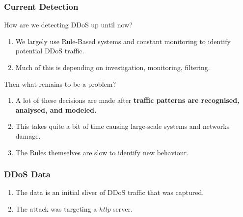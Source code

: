 \documentclass[11pt,
               aspectratio=169,
               hyperref={colorlinks}
               ]{beamer}
\begin{document}
	\begin{frame}
            \frametitle{Current Detection}
		How are we detecting DDoS up until now?\\
		\begin{enumerate}
			\item We largely use Rule-Based systems and constant monitoring to identify potential DDoS traffic. 
            \item Much of this is depending on investigation, monitoring, filtering.
		\end{enumerate}

		Then what remains to be a problem?\\
		\begin{enumerate}
            \item A lot of these decisions are made after \textbf{traffic patterns are recognised, analysed, and modeled.} 
            \item This takes quite a bit of time causing large-scale systems and networks damage. 
			\item The Rules themselves are slow to identify new behaviour. 
		\end{enumerate}
	\end{frame}

	\begin{frame}
            \frametitle{DDoS Data}

		\begin{enumerate}
                \item The data is an initial sliver of DDoS traffic that was captured. 
                \item The attack was targeting a \textit{http} server. 
		\end{enumerate}
	\end{frame}
\end{document}

